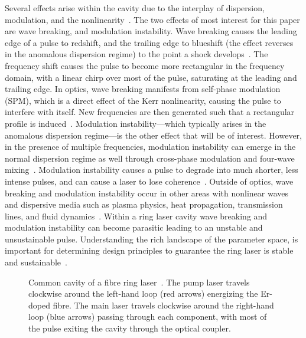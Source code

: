 \documentclass[9pt,twocolumn,twoside]{osajnl}
\begin{document}
Several effects arise within the cavity due to the interplay of dispersion, modulation, and the nonlinearity~\cite{bohun2015, coen1997, lapre2019, meng2020, oktem2010, shao2019, woodward2018}. The two effects of most interest for this paper are wave breaking, and modulation instability. Wave breaking causes the leading edge of a pulse to redshift, and the trailing edge to blueshift (the effect reverses in the anomalous dispersion regime) to the point a shock develops~\cite{anderson1992, rothenberg1989a, rothenberg1989b, tomlinson1984, tomlinson1985}. The frequency shift causes the pulse to become more rectangular in the frequency domain, with a linear chirp over most of the pulse, saturating at the leading and trailing edge. In optics, wave breaking manifests from self-phase modulation (SPM), which is a direct effect of the Kerr nonlinearity, causing the pulse to interfere with itself. New frequencies are then generated such that a rectangular profile is induced~\cite{agrawal2013, woodward2018}. Modulation instability---which typically arises in the anomalous dispersion regime---is the other effect that will be of interest. However, in the presence of multiple frequencies, modulation instability can emerge in the normal dispersion regime as well through cross-phase modulation and four-wave mixing~\cite{agrawal1987, agrawal2013, haelterman1992}. Modulation instability causes a pulse to degrade into much shorter, less intense pulses, and can cause a laser to lose coherence~\cite{agrawal1987, coen1997, haelterman1992}. Outside of optics, wave breaking and modulation instability occur in other areas with nonlinear waves and dispersive media such as plasma physics, heat propagation, transmission lines, and fluid dynamics~\cite{coen1997, rothenberg1989b}. Within a ring laser cavity wave breaking and modulation instability can become parasitic leading to an unstable and unsustainable pulse. Understanding the rich landscape of the parameter space, is important for determining design principles to guarantee the ring laser is stable and sustainable~\cite{bohun2015, burgoyneemail, finot2008, lapre2019, woodward2018}.

\begin{figure}[tbp]
	\centering
	
	\caption{Common cavity of a fibre ring laser~\cite{burgoyne2014, chung2017, lapre2019, shao2019}. The pump laser travels clockwise around the left-hand loop (red arrows) energizing the Er-doped fibre. The main laser travels clockwise around the right-hand loop (blue arrows) passing through each component, with most of the pulse exiting the cavity through the optical coupler.}
	\label{fig:cavity}
\end{figure}
\end{document}
